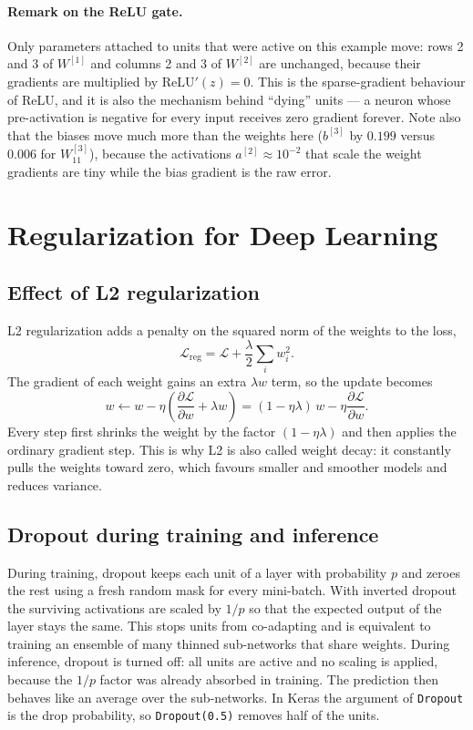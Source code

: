 \documentclass[11pt,a4paper]{article}
\begin{document}
\paragraph{Remark on the ReLU gate.} Only parameters attached to units that were active on
this example move: rows 2 and 3 of $W^{[1]}$ and columns 2 and 3 of $W^{[2]}$ are unchanged,
because their gradients are multiplied by $\mathrm{ReLU}'(z)=0$. This is the sparse-gradient
behaviour of ReLU, and it is also the mechanism behind ``dying'' units --- a neuron whose
pre-activation is negative for every input receives zero gradient forever. Note also that the
biases move much more than the weights here ($b^{[3]}$ by $0.199$ versus $0.006$ for
$W^{[3]}_{11}$), because the activations $a^{[2]}\approx 10^{-2}$ that scale the weight
gradients are tiny while the bias gradient is the raw error.

\section{Regularization for Deep Learning}

\subsection{Effect of L2 regularization}
L2 regularization adds a penalty on the squared norm of the weights to the loss,
\begin{equation}
\mathcal{L}_{\text{reg}}=\mathcal{L}+\frac{\lambda}{2}\sum_i w_i^2 .
\end{equation}
The gradient of each weight gains an extra $\lambda w$ term, so the update becomes
\begin{equation}
w\leftarrow w-\eta\!\left(\frac{\partial\mathcal{L}}{\partial w}+\lambda w\right)
=(1-\eta\lambda)\,w-\eta\frac{\partial\mathcal{L}}{\partial w}.
\end{equation}
Every step first shrinks the weight by the factor $(1-\eta\lambda)$ and then applies the
ordinary gradient step. This is why L2 is also called weight decay: it constantly pulls the
weights toward zero, which favours smaller and smoother models and reduces variance.

\subsection{Dropout during training and inference}
During training, dropout keeps each unit of a layer with probability $p$ and zeroes the rest
using a fresh random mask for every mini-batch. With inverted dropout the surviving
activations are scaled by $1/p$ so that the expected output of the layer stays the same.
This stops units from co-adapting and is equivalent to training an ensemble of many thinned
sub-networks that share weights. During inference, dropout is turned off: all units are
active and no scaling is applied, because the $1/p$ factor was already absorbed in training.
The prediction then behaves like an average over the sub-networks. In Keras the argument of
\texttt{Dropout} is the drop probability, so \texttt{Dropout(0.5)} removes half of the units.
\end{document}
